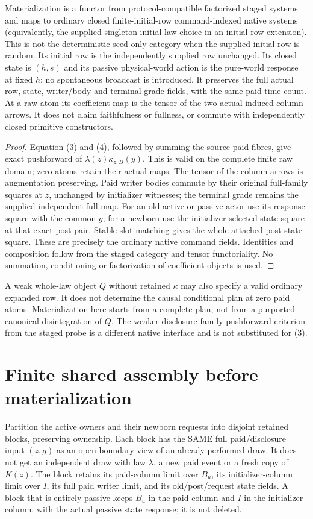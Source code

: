 \documentclass[11pt]{article}
\begin{document}
\begin{theorem}
Materialization is a functor from protocol-compatible factorized staged systems and maps to ordinary closed finite-initial-row command-indexed native systems (equivalently, the supplied singleton initial-law choice in an initial-row extension). This is not the deterministic-seed-only category when the supplied initial row is random. Its initial row is the independently supplied row unchanged. Its closed state is $(h,s)$ and its passive physical-world action is the pure-world response at fixed $h$; no spontaneous broadcast is introduced. It preserves the full actual row, state, writer/body and terminal-grade fields, with the same paid time count. At a raw atom its coefficient map is the tensor of the two actual induced column arrows. It does not claim faithfulness or fullness, or commute with independently closed primitive constructors.
\end{theorem}
\begin{proof}
Equation (3) and (4), followed by summing the source paid fibres, give exact pushforward of $\lambda(z)\kappa_{z,B}(y)$. This is valid on the complete finite raw domain; zero atoms retain their actual maps. The tensor of the column arrows is augmentation preserving. Paid writer bodies commute by their original full-family squares at $z$, unchanged by initializer witnesses; the terminal grade remains the supplied independent full map. For an old active or passive actor use its response square with the common $g$; for a newborn use the initializer-selected-state square at that exact post pair. Stable slot matching gives the whole attached post-state square. These are precisely the ordinary native command fields. Identities and composition follow from the staged category and tensor functoriality. No summation, conditioning or factorization of coefficient objects is used.\end{proof}

A weak whole-law object $Q$ without retained $\kappa$ may also specify a valid ordinary expanded row. It does not determine the causal conditional plan at zero paid atoms. Materialization here starts from a complete plan, not from a purported canonical disintegration of $Q$. The weaker disclosure-family pushforward criterion from the staged probe is a different native interface and is not substituted for (3).

\section{Finite shared assembly before materialization}
Partition the active owners and their newborn requests into disjoint retained blocks, preserving ownership. Each block has the SAME full paid/disclosure input $(z,g)$ as an open boundary view of an already performed draw. It does not get an independent draw with law $\lambda$, a new paid event or a fresh copy of $K(z)$. The block retains its paid-column limit over $B_u$, its initializer-column limit over $I$, its full paid writer limit, and its old/post/request state fields. A block that is entirely passive keeps $B_u$ in the paid column and $I$ in the initializer column, with the actual passive state response; it is not deleted.
\end{document}
